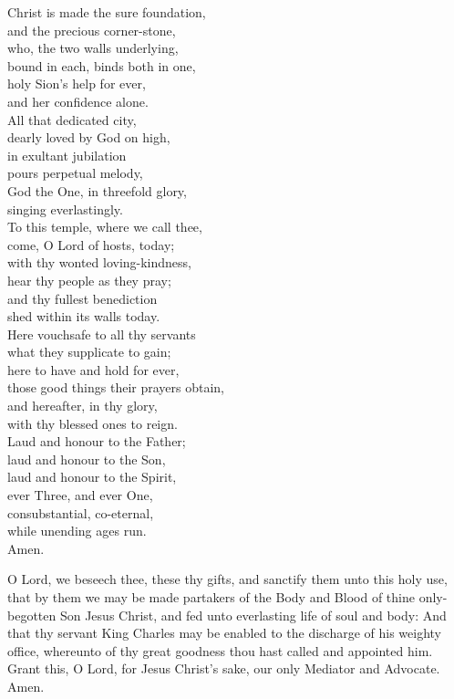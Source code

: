{\begin{center}
Christ is made the sure foundation,\\
and the precious corner-stone,\\
who, the two walls underlying,\\
bound in each, binds both in one,\\
holy Sion’s help for ever,\\
and her confidence alone.\\
All that dedicated city,\\
dearly loved by God on high,\\
in exultant jubilation\\
pours perpetual melody,\\
God the One, in threefold glory,\\
singing everlastingly.\\
To this temple, where we call thee,\\
come, O Lord of hosts, today;\\
with thy wonted loving-kindness,\\
hear thy people as they pray;\\
and thy fullest benediction\\
shed within its walls today.\\
Here vouchsafe to all thy servants\\
what they supplicate to gain;\\
here to have and hold for ever,\\
those good things their prayers obtain,\\
and hereafter, in thy glory,\\
with thy blessed ones to reign.\\
Laud and honour to the Father;\\
laud and honour to the Son,\\
laud and honour to the Spirit,\\
ever Three, and ever One,\\
consubstantial, co-eternal,\\
while unending ages run.\\Amen.
\end{center}


\clearpage




 O Lord, we beseech thee, these thy gifts,
and sanctify them unto this holy use,
that by them we may be made partakers of the Body and Blood
of thine only-begotten Son Jesus Christ,
and fed unto everlasting life of soul and body:
And that thy servant King Charles
may be enabled to the discharge of his weighty office,
whereunto of thy great goodness thou hast called and appointed him.
Grant this, O Lord, for Jesus Christ’s sake,
our only Mediator and Advocate. Amen.

}
